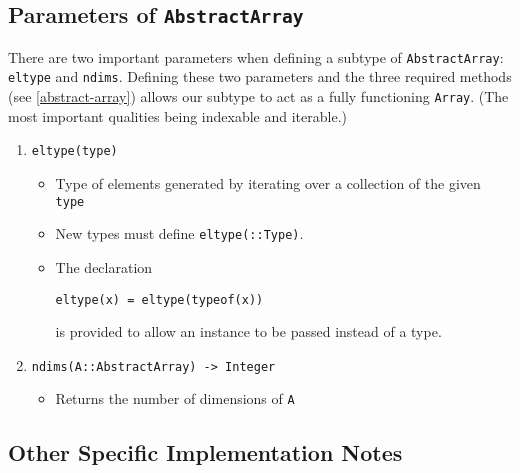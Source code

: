 \documentclass[10pt]{article}
\begin{document}
\subsection{Parameters of \texttt{AbstractArray}}\label{params}
There are two important parameters when defining a subtype of
\texttt{AbstractArray}: \texttt{eltype} and \texttt{ndims}.
Defining these two parameters and the three required methods 
(see \cref{abstract-array})
allows our subtype to act as a fully functioning \texttt{Array}.
(The most important qualities being indexable and iterable.)
\begin{enumerate}
\def\labelenumi{\arabic{enumi}.}
\item
    \texttt{eltype(type)}
    \begin{itemize}
    \item
        Type of elements generated by iterating over a collection
        of the given \texttt{type}
    \item
        New types must define \texttt{eltype(::Type)}.
    \item
        The declaration
        \begin{center}
            \texttt{eltype(x) = eltype(typeof(x))}
        \end{center}
        is provided to allow an instance to be passed instead of a type.
    \end{itemize}
\item
    \texttt{ndims(A::AbstractArray) -> Integer}
    \begin{itemize}
    \item
        Returns the number of dimensions of \texttt{A}
    \end{itemize}
\end{enumerate}

\subsection{Other Specific Implementation Notes}\label{specific-notes}
\todo
\end{document}
